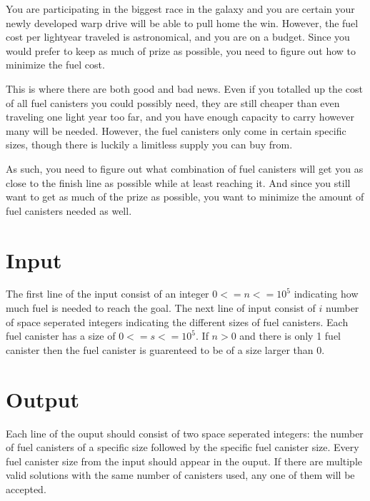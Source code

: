 
You are participating in the biggest race in the galaxy and you are certain your newly developed warp drive will be able to pull home the win. However, the fuel cost per lightyear traveled is astronomical, and you are on a budget. Since you would prefer to keep as much of prize as possible, you need to figure out how to minimize the fuel cost.

This is where there are both good and bad news. Even if you totalled up the cost of all fuel canisters you could possibly need,  they are still cheaper than even traveling one light year too far, and you have enough capacity to carry however many will be needed. However, the fuel canisters only come in certain specific sizes, though there is luckily a limitless supply you can buy from.

As such, you need to figure out what combination of fuel canisters will get you as close to the finish line as possible while at least reaching it. And since you still want to get as much of the prize as possible, you want to minimize the amount of fuel canisters needed as well.

\section*{Input}
The first line of the input consist of an integer $0<=n<=10^5$ indicating how much fuel is needed to reach the goal.
The next line of input consist of $i$ number of space seperated integers indicating the different sizes of fuel canisters.
Each fuel canister has a size of $0<=s<=10^5$. If $n>0$ and there is only 1 fuel canister then the fuel canister is guarenteed to be of a size larger than 0.
\section*{Output}
Each line of the ouput should consist of two space seperated integers: the number of fuel canisters of a specific size followed by the specific fuel canister size.
Every fuel canister size from the input should appear in the ouput. 
If there are multiple valid solutions with the same number of canisters used, any one of them will be accepted.